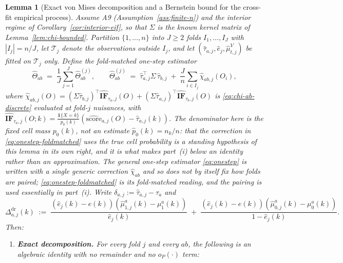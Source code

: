 \documentclass[11pt]{article}
\theoremstyle{plain}
\newtheorem{lemma}[theorem]{Lemma}
\theoremstyle{definition}
\theoremstyle{remark}
\begin{document}
\begin{lemma}[Exact von Mises decomposition and a Bernstein bound for the cross-fit
empirical process]\label{lem:D2-bernstein}
Assume A9 (Assumption~\ref{ass:finite-n}) and the interior regime of
Corollary~\ref{cor:interior-eif}, so that $\Sigma$ is the known kernel matrix of
Lemma~\ref{lem:chi-bounded}. Partition $\{1,\dots,n\}$ into $J\ge2$ folds
$I_1,\dots,I_J$ with $|I_j|=n/J$, let $\mathcal T_j$ denote the observations outside
$I_j$, and let $(\hat\tau_{a,j},\hat e_j,\hat\mu^V_{t,j})$ be fitted on $\mathcal T_j$
only. Define the \emph{fold-matched} one-step estimator
\begin{equation}\label{eq:onestep-foldmatched}
    \hat\Theta_{ab}\;=\;\frac1J\sum_{j=1}^J\hat\Theta^{(j)}_{ab},\qquad
    \hat\Theta^{(j)}_{ab}\;=\;\hat\tau_{a,j}^\top\Sigma\,\hat\tau_{b,j}\;+\;\frac{J}{n}\sum_{i\in I_j}\hat\chi_{ab,j}(O_i),
\end{equation}
where
$\hat\chi_{ab,j}(O)=(\Sigma\hat\tau_{b,j})^\top\widehat{\mathbf{IF}}_{\tau_a,j}(O)+(\Sigma\hat\tau_{a,j})^\top\widehat{\mathbf{IF}}_{\tau_b,j}(O)$
is \eqref{eq:chi-ab-discrete} evaluated at fold-$j$ nuisances, with
$\widehat{\mathbf{IF}}_{\tau_a,j}(O;k)=\frac{\mathbf1\{X=k\}}{p_0(k)}(\widehat{\mathrm{score}}_{a,j}(O)-\hat\tau_{a,j}(k))$.
The denominator here is the fixed cell mass $p_0(k)$, not an estimate $\hat p_0(k)=n_k/n$:
that the correction in \eqref{eq:onestep-foldmatched} uses the true cell probability is a
standing hypothesis of this lemma in its own right, and it is what makes part~(i) below an
identity rather than an approximation. The general one-step estimator \eqref{eq:onestep} is
written with a single
generic correction $\hat\chi_{ab}$ and so does not by itself fix how folds are paired;
\eqref{eq:onestep-foldmatched} is its fold-matched reading, and the pairing is used
essentially in part~(i). Write $\delta_{a,j}:=\hat\tau_{a,j}-\tau_a$ and
\begin{equation}\label{eq:dr-bias}
    \Delta^{\mathrm{dr}}_{a,j}(k)\;:=\;\frac{(\hat e_j(k)-e(k))(\hat\mu^a_{1,j}(k)-\mu^a_1(k))}{\hat e_j(k)}\;+\;\frac{(\hat e_j(k)-e(k))(\hat\mu^a_{0,j}(k)-\mu^a_0(k))}{1-\hat e_j(k)} .
\end{equation}
Then:
\begin{enumerate}[label=(\roman*)]
    \item \textbf{Exact decomposition.} For every fold $j$ and every $ab$, the following
    is an algebraic identity with no remainder and no $o_P(\cdot)$ term:
    \begin{equation}\label{eq:vonmises-exact}

\end{equation}
\end{enumerate}
\end{lemma}
\end{document}
